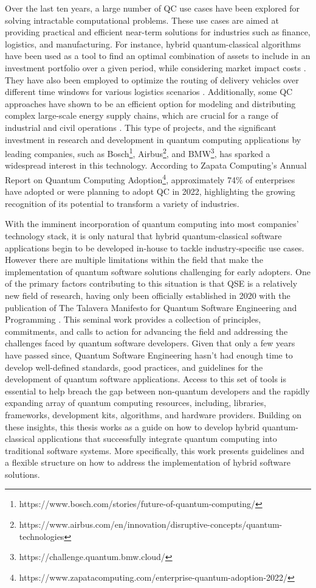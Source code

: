 Over the last ten years, a large number of QC use cases have been explored for solving intractable computational problems. These use cases are aimed at providing practical and efficient near-term solutions for industries such as finance, logistics, and manufacturing. For instance, hybrid quantum-classical algorithms have been used as a tool to find an optimal combination of assets to include in an investment portfolio over a given period, while considering market impact costs \cite{rosemberg-2015-trading}. They have also been employed to optimize the routing of delivery vehicles over different time windows for various logistics scenarios \cite{hardwood-2021-routing}. Additionally, some QC approaches have shown to be an efficient option for modeling and distributing complex large-scale energy supply chains, which are crucial for a range of industrial and civil operations \cite{akshay-2019-energy}. This type of projects, and the significant investment in research and development in quantum computing applications by leading companies, such as Bosch\footnote{https://www.bosch.com/stories/future-of-quantum-computing/}, Airbus\footnote{https://www.airbus.com/en/innovation/disruptive-concepts/quantum-technologies}, and BMW\footnote{https://challenge.quantum.bmw.cloud/}, has sparked a widespread interest in this technology. According to Zapata Computing’s Annual Report on Quantum Computing Adoption\footnote{https://www.zapatacomputing.com/enterprise-quantum-adoption-2022/}, approximately 74\% of enterprises have adopted or were planning to adopt QC in 2022, highlighting the growing recognition of its potential to transform a variety of industries.

With the imminent incorporation of quantum computing into most companies' technology stack, it is only natural that hybrid quantum-classical software applications begin to be developed in-house to tackle industry-specific use cases. However there are multiple limitations within the field that make the implementation of quantum software solutions challenging for early adopters. One of the primary factors contributing to this situation is that QSE is a relatively new field of research, having only been officially established in 2020 with the publication of The Talavera Manifesto for Quantum Software Engineering and Programming  \cite{piattini-2020-talavera}. This seminal work provides a collection of principles, commitments, and calls to action for advancing the field and addressing the challenges faced by quantum software developers. Given that only a few years have passed since, Quantum Software Engineering hasn't had enough time to develop well-defined standards, good practices, and guidelines for the development of quantum software applications. Access to this set of tools is essential to help breach the gap between non-quantum developers and the rapidly expanding array of quantum computing resources, including, libraries, frameworks, development kits, algorithms, and hardware providers. Building on these insights, this thesis works as a guide on how to develop hybrid quantum-classical applications that successfully integrate quantum computing into traditional software systems. More specifically, this work presents guidelines and a flexible structure on how to address the implementation of hybrid software solutions.

